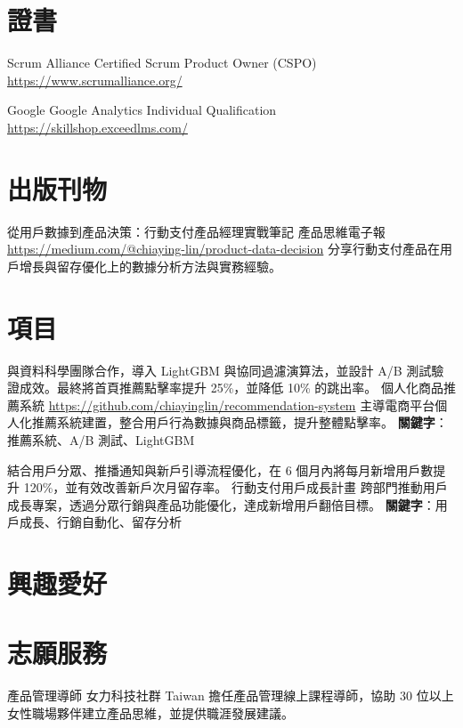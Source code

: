 \documentclass[a4paper, serif, 10pt]{moderncv}
\begin{document}
\section{證書}

        {Scrum Alliance}
        {Certified Scrum Product Owner (CSPO)}
        {\url{https://www.scrumalliance.org/}}
        {}
        {}

        {Google}
        {Google Analytics Individual Qualification}
        {\url{https://skillshop.exceedlms.com/}}
        {}
        {}
\section{出版刊物}

        {從用戶數據到產品決策：行動支付產品經理實戰筆記}
        {產品思維電子報}
        {\url{https://medium.com/@chiaying-lin/product-data-decision}}
        {}
        {分享行動支付產品在用戶增長與留存優化上的數據分析方法與實務經驗。}
\section{項目}

        {與資料科學團隊合作，導入 LightGBM 與協同過濾演算法，並設計 A/B 測試驗證成效。最終將首頁推薦點擊率提升 25\%，並降低 10\% 的跳出率。
}
        {個人化商品推薦系統}
        {\url{https://github.com/chiayinglin/recommendation-system}}
        {}
        {主導電商平台個人化推薦系統建置，整合用戶行為數據與商品標籤，提升整體點擊率。
\textbf{關鍵字}：推薦系統、A/B 測試、LightGBM}

        {結合用戶分眾、推播通知與新戶引導流程優化，在 6 個月內將每月新增用戶數提升 120\%，並有效改善新戶次月留存率。
}
        {行動支付用戶成長計畫}
        {}
        {}
        {跨部門推動用戶成長專案，透過分眾行銷與產品功能優化，達成新增用戶翻倍目標。
\textbf{關鍵字}：用戶成長、行銷自動化、留存分析}
\section{興趣愛好}

\section{志願服務}

        {產品管理導師}
        {女力科技社群 Taiwan}
        {}
        {}
        {擔任產品管理線上課程導師，協助 30 位以上女性職場夥伴建立產品思維，並提供職涯發展建議。}
    
\end{document}
